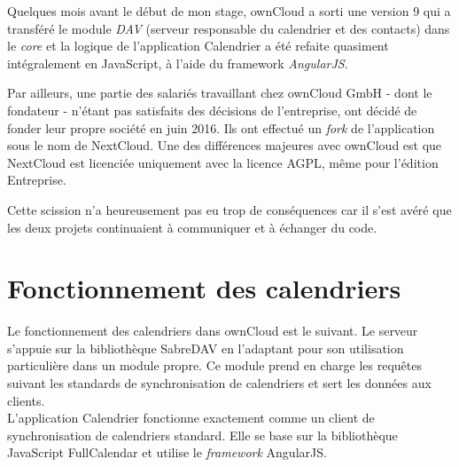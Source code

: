 \documentclass[10pt,a4paper, twoside]{report}
\begin{document}
	Quelques mois avant le début de mon stage, ownCloud a sorti une version 9 qui a transféré le module \textit{DAV} (serveur responsable du calendrier et des contacts) dans le \textit{core} et la logique de l'application Calendrier a été refaite quasiment intégralement en JavaScript, à l'aide du framework \textit{AngularJS}.
	
	Par ailleurs, une partie des salariés travaillant chez ownCloud GmbH - dont le fondateur - n'étant pas satisfaits des décisions de l'entreprise, ont décidé de fonder leur propre société en juin 2016. Ils ont effectué un \textit{fork} de l'application sous le nom de NextCloud. Une des différences majeures avec ownCloud est que NextCloud est licenciée uniquement avec la licence AGPL, même pour l'édition Entreprise. 
	
	Cette scission n'a heureusement pas eu trop de conséquences car il s'est avéré que les deux projets continuaient à communiquer et à échanger du code.
	
	\section{Fonctionnement des calendriers}
	
	Le fonctionnement des calendriers dans ownCloud est le suivant. Le serveur s'appuie sur la bibliothèque SabreDAV en l'adaptant pour son utilisation particulière dans un module propre. Ce module prend en charge les requêtes suivant les standards de synchronisation de calendriers et sert les données aux clients.
	\\
	
	L'application Calendrier fonctionne exactement comme un client de synchronisation de calendriers standard. Elle se base sur la bibliothèque JavaScript FullCalendar et utilise le \textit{framework} AngularJS.
	
\end{document}
